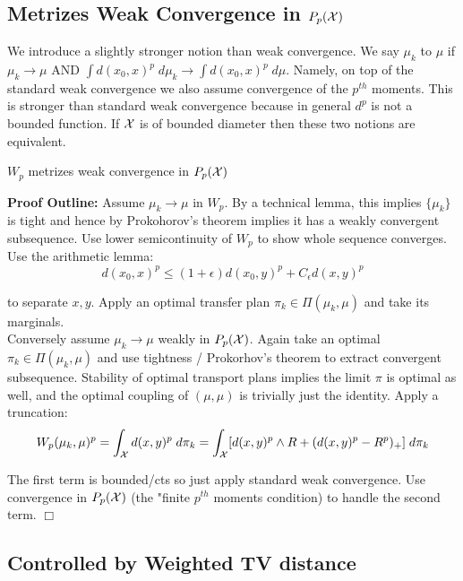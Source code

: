 \subsection{Metrizes Weak Convergence in $P_p({\mathcal X})$}

We introduce a slightly stronger notion than weak convergence. We say $\mu_k$  to $\mu$ if $\mu_k \to \mu$ AND $\int d(x_0, x)^p \;d\mu_k \to \int d(x_0, x)^p \;d\mu$. Namely, on top of the standard weak convergence we also assume convergence of the $p^{th}$ moments. This is stronger than standard weak convergence because in general $d^p$ is not a bounded function. If ${\mathcal X}$ is of bounded diameter then these two notions are equivalent.\\

\begin{thm}
    $W_p$ metrizes weak convergence in $P_p({\mathcal X})$
\end{thm}

\noindent \textbf{Proof Outline: } Assume $\mu_k \to \mu$ in $W_p$. By a technical lemma, this implies $\{\mu_k\}$ is tight and hence by Prokohorov's theorem implies it has a weakly convergent subsequence. Use lower semicontinuity of $W_p$ to show whole sequence converges. Use the arithmetic lemma:
%
\[d(x_0, x)^p \leq (1+\epsilon)d(x_0,y)^p + C_\epsilon d(x,y)^p\]

\noindent to separate $x,y$. Apply an optimal transfer plan $\pi_k \in \Pi(\mu_k, \mu)$ and take its marginals.\\

\noindent Conversely assume $\mu_k \to \mu$ weakly in $P_p({\mathcal X})$. Again take an optimal $\pi_k \in \Pi(\mu_k, \mu)$ and use tightness / Prokorhov's theorem to extract convergent subsequence. Stability of optimal transport plans implies the limit $\pi$ is optimal as well, and the optimal coupling of $(\mu, \mu)$ is trivially just the identity. Apply a truncation:
%
\[W_p(\mu_k, \mu)^p = \int_{\mathcal X} d(x,y)^p \; d\pi_k = \int_{\mathcal X} [d(x,y)^p \wedge R + (d(x,y)^p - R^p)_+] \; d\pi_k\]

\noindent The first term is bounded/cts so just apply standard weak convergence. Use convergence in $P_p({\mathcal X})$ (the "finite $p^{th}$ moments condition) to handle the second term. $\Box$




\subsection{Controlled by Weighted TV distance}

